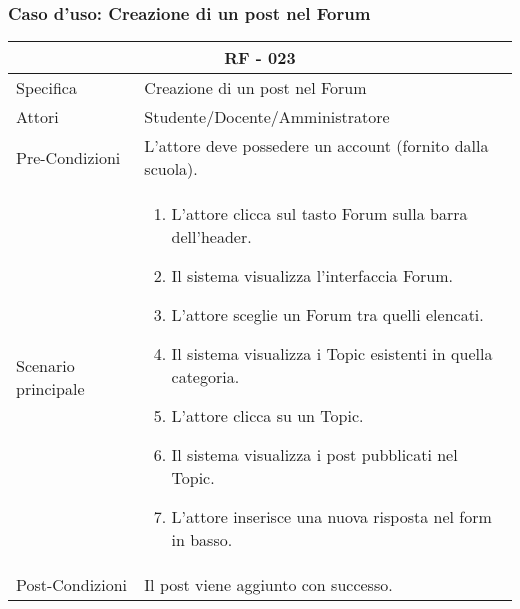 \documentclass{article}
\begin{document}
\subsubsection{\textbf{Caso d'uso: Creazione di un post nel Forum}}
\begin{tabular}{ |p{3cm}|p{9cm}|  }
	\hline
	\multicolumn{2}{|c|}{\textbf{RF - 023}} \\
	\hline
	Specifica& Creazione di un post nel Forum\\
	\hline
	Attori& Studente/Docente/Amministratore\\
	\hline
	Pre-Condizioni& L'attore deve possedere un account (fornito dalla scuola).\\
	\hline
	Scenario principale& \begin{enumerate}
		\item L'attore clicca sul tasto Forum sulla barra dell'header.
		\item Il sistema visualizza l'interfaccia Forum.
		\item L'attore sceglie un Forum tra quelli elencati.
		\item Il sistema visualizza i Topic esistenti in quella categoria.
		\item L'attore clicca su un Topic.
		\item Il sistema visualizza i post pubblicati nel Topic.
		\item L'attore inserisce una nuova risposta nel form in basso.
	\end{enumerate}\\
	\hline
	Post-Condizioni& Il post viene aggiunto con successo.\\
	\hline
\end{tabular}
\end{document}
